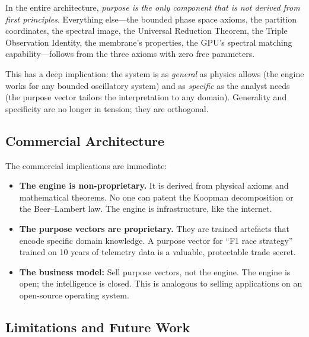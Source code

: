 \documentclass[11pt,twocolumn,a4paper]{article}
\theoremstyle{definition}
\theoremstyle{remark}
\begin{document}
In the entire architecture, \emph{purpose is the only component that is not derived from first principles}.  Everything else---the bounded phase space axioms, the partition coordinates, the spectral image, the Universal Reduction Theorem, the Triple Observation Identity, the membrane's properties, the GPU's spectral matching capability---follows from the three axioms with zero free parameters.

This has a deep implication: the system is as \emph{general} as physics allows (the engine works for any bounded oscillatory system) and as \emph{specific} as the analyst needs (the purpose vector tailors the interpretation to any domain).  Generality and specificity are no longer in tension; they are orthogonal.

\subsection{Commercial Architecture}

The commercial implications are immediate:
\begin{itemize}
    \item \textbf{The engine is non-proprietary.}  It is derived from physical axioms and mathematical theorems.  No one can patent the Koopman decomposition or the Beer--Lambert law.  The engine is infrastructure, like the internet.

    \item \textbf{The purpose vectors are proprietary.}  They are trained artefacts that encode specific domain knowledge.  A purpose vector for ``F1 race strategy'' trained on 10 years of telemetry data is a valuable, protectable trade secret.

    \item \textbf{The business model:} Sell purpose vectors, not the engine.  The engine is open; the intelligence is closed.  This is analogous to selling applications on an open-source operating system.
\end{itemize}

\subsection{Limitations and Future Work}
\end{document}
